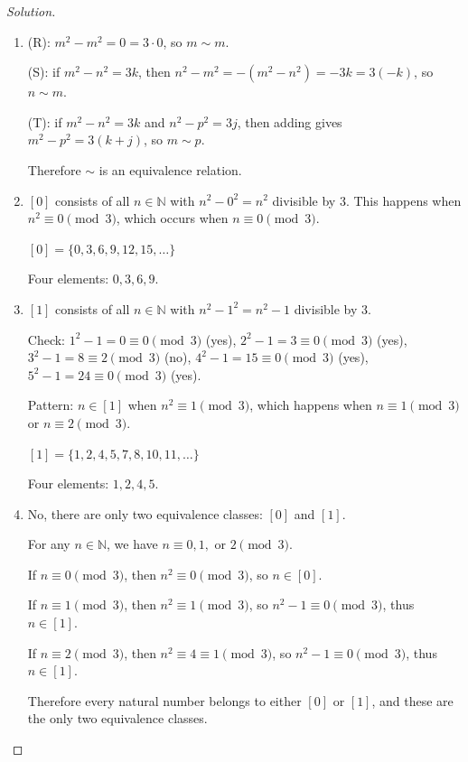 \documentclass[12pt]{article}
\newcommand{\NN}{\ensuremath{\mathbb N}}
\begin{document}
\begin{proof}[Solution]
~
\begin{enumerate}[label=(\alph*)]
    \item (R): $m^2 - m^2 = 0 = 3 \cdot 0$, so $m \sim m$.
    
    (S): if $m^2 - n^2 = 3k$, then $n^2 - m^2 = -(m^2 - n^2) = -3k = 3(-k)$, so $n \sim m$.
    
    (T): if $m^2 - n^2 = 3k$ and $n^2 - p^2 = 3j$, then adding gives $m^2 - p^2 = 3(k + j)$, so $m \sim p$.
    
    Therefore $\sim$ is an equivalence relation.
    
    \item $[0]$ consists of all $n \in \NN$ with $n^2 - 0^2 = n^2$ divisible by 3. This happens when $n^2 \equiv 0 \pmod{3}$, which occurs when $n \equiv 0 \pmod{3}$.
    
    $[0] = \{0, 3, 6, 9, 12, 15, \ldots\}$
    
    Four elements: $0, 3, 6, 9$.
    
    \item $[1]$ consists of all $n \in \NN$ with $n^2 - 1^2 = n^2 - 1$ divisible by 3.
    
    Check: $1^2 - 1 = 0 \equiv 0 \pmod{3}$ (yes), $2^2 - 1 = 3 \equiv 0 \pmod{3}$ (yes), $3^2 - 1 = 8 \equiv 2 \pmod{3}$ (no), $4^2 - 1 = 15 \equiv 0 \pmod{3}$ (yes), $5^2 - 1 = 24 \equiv 0 \pmod{3}$ (yes).
    
    Pattern: $n \in [1]$ when $n^2 \equiv 1 \pmod{3}$, which happens when $n \equiv 1 \pmod{3}$ or $n \equiv 2 \pmod{3}$.
    
    $[1] = \{1, 2, 4, 5, 7, 8, 10, 11, \ldots\}$
    
    Four elements: $1, 2, 4, 5$.
    
    \item No, there are only two equivalence classes: $[0]$ and $[1]$.
    
    For any $n \in \NN$, we have $n \equiv 0, 1,$ or $2 \pmod{3}$.
    
    If $n \equiv 0 \pmod{3}$, then $n^2 \equiv 0 \pmod{3}$, so $n \in [0]$.
    
    If $n \equiv 1 \pmod{3}$, then $n^2 \equiv 1 \pmod{3}$, so $n^2 - 1 \equiv 0 \pmod{3}$, thus $n \in [1]$.
    
    If $n \equiv 2 \pmod{3}$, then $n^2 \equiv 4 \equiv 1 \pmod{3}$, so $n^2 - 1 \equiv 0 \pmod{3}$, thus $n \in [1]$.
    
    Therefore every natural number belongs to either $[0]$ or $[1]$, and these are the only two equivalence classes.
\end{enumerate}
\end{proof}
\end{document}
